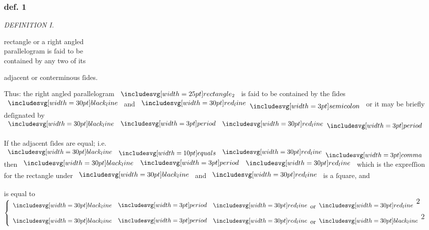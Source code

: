 \documentclass[11pt,preview]{standalone}
\begin{document}
\subsubsection{def. 1}

\begin{minipage}[t]{0.54\textwidth}
  \begin{center}
    \textit{DEFINITION I.}\label{book2def1} \\
  \end{center}

  \hfill

  \begin{center}
    \raggedright \lettrine[lines=3, loversize=1, nindent=0pt]{}{} rectangle or a right angled\\ parallelogram is ſaid to be\\ contained by any two of its
  \end{center}
  adjacent or conterminous ſides.
\end{minipage}%
\hfill
\begin{minipage}[t]{0.43\textwidth}
  \vspace{10pt}
  
\end{minipage}%

\hfill

\hfill

\begin{center}
  Thus: the right angled parallelogram $\img{rectangle_2}$  is ſaid to be contained by the ſides $\blackline$ and $\redline \bsemicolon$ or it may be briefly deſignated by $\blackline \bmultiply \redline \bperiod$
\end{center}

\hfill

\begin{center}
  If the adjacent ſides are equal; i.e. $\blackline \bequals \redline \bcomma$ then $\blackline \bmultiply \redline$ which is the expreſſion for the rectangle under $\blackline$ and $\redline$ is a ſquare, and
\end{center}

\hfill

\begin{center}
  is equal to $\left\{\begin{aligned}\blackline & \bmultiply \redline \text{or} \redline^{\text{\large 2}} \\ \blackline & \bmultiply \redline \text{or} \blackline^{\text{\large 2}} \end{aligned}\right.$
\end{center}
\end{document}
